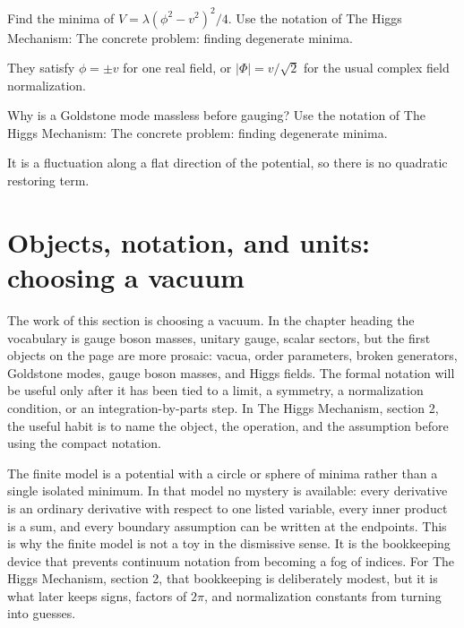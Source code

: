 \begin{exercise}
Find the minima of \(V=\lambda(\phi^2-v^2)^2/4\).  Use the notation of The Higgs Mechanism: The concrete problem: finding degenerate minima.
\begin{answer}
They satisfy \(\phi=\pm v\) for one real field, or \(|\Phi|=v/\sqrt2\) for the usual complex field normalization.
\end{answer}
\end{exercise}

\begin{exercise}
Why is a Goldstone mode massless before gauging?  Use the notation of The Higgs Mechanism: The concrete problem: finding degenerate minima.
\begin{answer}
It is a fluctuation along a flat direction of the potential, so there is no quadratic restoring term.
\end{answer}
\end{exercise}



\section{Objects, notation, and units: choosing a vacuum}













The work of this section is choosing a vacuum.  In the chapter heading the vocabulary is gauge boson masses, unitary gauge, scalar sectors, but the first objects on the page are more prosaic: vacua, order parameters, broken generators, Goldstone modes, gauge boson masses, and Higgs fields.  The formal notation will be useful only after it has been tied to a limit, a symmetry, a normalization condition, or an integration-by-parts step.  In The Higgs Mechanism, section 2, the useful habit is to name the object, the operation, and the assumption before using the compact notation.

The finite model is a potential with a circle or sphere of minima rather than a single isolated minimum.  In that model no mystery is available: every derivative is an ordinary derivative with respect to one listed variable, every inner product is a sum, and every boundary assumption can be written at the endpoints.  This is why the finite model is not a toy in the dismissive sense.  It is the bookkeeping device that prevents continuum notation from becoming a fog of indices.  For The Higgs Mechanism, section 2, that bookkeeping is deliberately modest, but it is what later keeps signs, factors of \(2\pi\), and normalization constants from turning into guesses.

